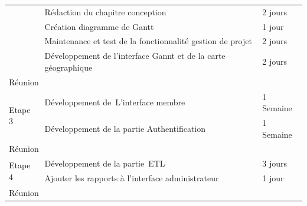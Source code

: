\begin{table}
\begin{tabular}{|l|l|l|}
\cline{2-3}
                                & Rédaction du chapitre conception                                                                                                               & 2 jours               \\
\cline{2-3}
                                & Création diagramme de Gantt                                                                                                                    & 1 jour                \\
\cline{2-3}
                                & Maintenance et test de la fonctionnalité gestion de projet                                                                                     & 2 jours               \\
\cline{2-3}
                                & Développement de l’interface Gannt et de la carte géographique                                                                                 & 2 jours               \\
\hline
\multicolumn{3}{|l|}{Réunion}                                                                                                                                                                            \\
\hline
\multirow{2}{*}{Etape 3}        & Développement de~L’interface membre                                                                                                            & 1 Semaine             \\
\cline{2-3}
                                & Développement de la partie Authentification                                                                                                    & 1 Semaine             \\
\hline
\multicolumn{3}{|l|}{Réunion}                                                                                                                                                                            \\
\hline
\multirow{2}{*}{Etape 4}        & Développement de la partie~ETL                                                                                                                 & 3 jours               \\
\cline{2-3}
                                & Ajouter les rapports à l’interface administrateur                                                                                              & 1 jour                \\
\hline
\multicolumn{3}{|l|}{Réunion}                                                                                                                                                                            \\

\end{tabular}
\end{table}
